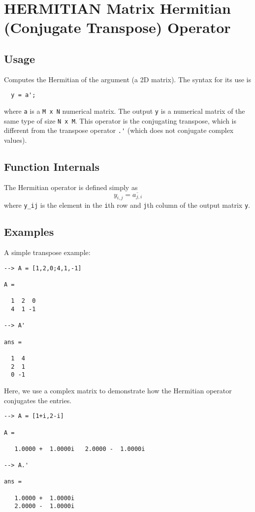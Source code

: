 \section{HERMITIAN Matrix Hermitian (Conjugate Transpose) Operator}

\subsection{Usage}

Computes the Hermitian of the argument (a 2D matrix).  The syntax for its use is
\begin{verbatim}
  y = a';
\end{verbatim}
where \verb|a| is a \verb|M x N| numerical matrix.  The output \verb|y| is a numerical matrix
of the same type of size \verb|N x M|.  This operator is the conjugating transpose,
which is different from the transpose operator \verb|.'| (which does not 
conjugate complex values).
\subsection{Function Internals}

The Hermitian operator is defined simply as
\[
  y_{i,j} = \overline{a_{j,i}}
\]
where \verb|y_ij| is the element in the \verb|i|th row and \verb|j|th column of the output matrix \verb|y|.
\subsection{Examples}

A simple transpose example:
\begin{verbatim}
--> A = [1,2,0;4,1,-1]

A = 

  1  2  0 
  4  1 -1 

--> A'

ans = 

  1  4 
  2  1 
  0 -1 
\end{verbatim}
Here, we use a complex matrix to demonstrate how the Hermitian operator conjugates the entries.
\begin{verbatim}
--> A = [1+i,2-i]

A = 

   1.0000 +  1.0000i   2.0000 -  1.0000i 

--> A.'

ans = 

   1.0000 +  1.0000i 
   2.0000 -  1.0000i 
\end{verbatim}
